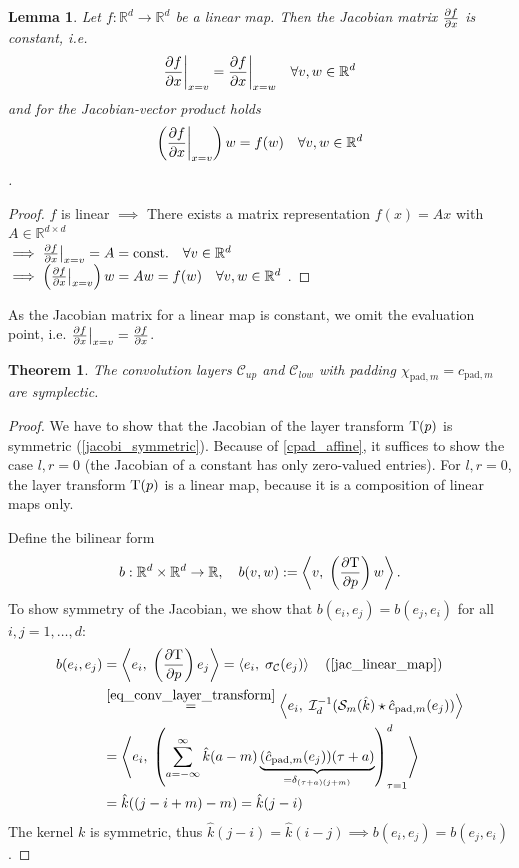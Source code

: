 \documentclass[twoside,a4paper]{article}
\newtheorem{theorem}{Theorem}
\newtheorem{lemma}{Lemma}
\begin{document}
\begin{lemma}\label{jac_linear_map}
	Let $f: \mathbb{R}^d \to \mathbb{R}^d$ be a linear map. Then the Jacobian matrix
	$\frac{\partial f}{\partial x}$ is constant, i.e.
	\begin{equation*}
		\frac{\partial f}{\partial x} \bigg|_{x = v} = \frac{\partial f}{\partial x} \bigg|_{x = w} \quad \forall v,w \in \mathbb{R}^d
	\end{equation*}
	and for the Jacobian-vector product holds
	\begin{equation*}
		\left( \frac{\partial f}{\partial x} \bigg|_{x = v} \right) w = f(w) \quad \forall v,w \in \mathbb{R}^d
	\end{equation*}
	.
\end{lemma}
\begin{proof}
	$f$ is linear $\implies$ There exists a matrix representation $f(x) = Ax$ with
	$A \in \mathbb{R}^{d \times d}$ \\
	$\implies \frac{\partial f}{\partial x} \big|_{x=v} = A = \text{const.} \quad \forall v \in \mathbb{R}^d$
	$\implies \left( \frac{\partial f}{\partial x} \big|_{x=v} \right) w = Aw = f(w) \quad \forall v,w \in \mathbb{R}^d$
	.
\end{proof}
As the Jacobian matrix for a linear map is constant, we omit the evaluation point, i.e.
$\frac{\partial f}{\partial x} \big|_{x=v} = \frac{\partial f}{\partial x}$.

\begin{theorem}\label{thm_conv_const_pad_symplectic}
	The convolution layers $\mathcal{C}_{up}$ and $\mathcal{C}_{low}$
	with padding $\chi_{\text{pad},m} = c_{\text{pad},m}$ are symplectic.
\end{theorem}
\begin{proof}
	We have to show that the Jacobian of the layer transform $\mathrm{T}(p)$
	is symmetric (\cref{jacobi_symmetric}).
	Because of \cref{cpad_affine}, it suffices to show the case $l,r=0$ (the Jacobian
	of a constant has only zero-valued entries). For $l,r=0$, the layer transform 
	$\mathrm{T}(p)$ 
	is a linear map, because it is a composition of linear maps only.

	Define the bilinear form
	\begin{equation}\label{eq_bilinear_proof_conv}
		b : \mathbb{R}^d \times \mathbb{R}^d \to \mathbb{R},
		\quad b(v,w) := \left\langle v,\; \left( \frac{\partial \mathrm{T}}{\partial p} \right) w \right\rangle
		.
	\end{equation}
	To show symmetry of the Jacobian, we show that 
	$b(e_i, e_j) = b(e_j, e_i)$ for all $i,j=1,\dots,d$:
	\begin{align*}
		b(e_i, e_j) &= \ip{e_i}{\lb \jac{\layertf}{p} \rb e_j}
		= \ip{e_i}{\activation_{\mathcal{C}}(e_j)} \quad \text{(\cref{jac_linear_map})} \\
		&\stackrel{\cref{eq_conv_layer_transform}}{=} \ip{e_i}{\mathcal{I}_{d}^{-1} (
			\mathcal{S}_{m}(\hat{k}) \star \hat{c}_{\text{pad},m}(e_j)
		)} \\
		&= \ip{e_i}{
			\lb \sum_{a=-\infty}^{\infty} 
				\hat{k}(a-m)
				\underbrace{(\hat{c}_{\text{pad},m}(e_j))(\tau+a)}_{
					= \delta_{(\tau+a) (j+m)}
				}
			\rb_{\tau=1}^d
		} \\
		&= \hat{k}((j-i+m)-m) = \hat{k}(j-i)
	\end{align*}
	The kernel $k$ is symmetric, thus $\hat{k}(j-i) = \hat{k}(i-j) \implies b(e_i, e_j) = b(e_j,e_i)$.
\end{proof}
\end{document}
